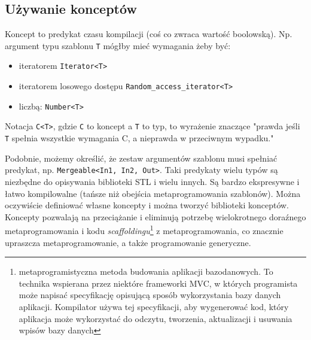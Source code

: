 \documentclass[11pt, a4paper]{article}
\begin{document}
\lstset{language=C++}

\subsection{Używanie konceptów}

Koncept to predykat czasu kompilacji (coś co zwraca wartość boolowską). Np. argument typu szablonu \verb#T# mógłby mieć wymagania żeby być:

\begin{itemize}

\item iteratorem \verb#Iterator<T>#

\item iteratorem losowego dostępu \verb#Random_access_iterator<T>#

\item liczbą: \verb#Number<T>#

\end{itemize}

Notacja \verb#C<T>#, gdzie \verb#C# to koncept a \verb#T# to typ, to wyrażenie znaczące "prawda jeśli \verb#T# spełnia wszystkie wymagania C, a nieprawda w przeciwnym wypadku."

Podobnie, możemy określić, że zestaw argumentów szablonu musi spełniać predykat, np. \verb#Mergeable<In1, In2, Out>#. Taki predykaty wielu typów są niezbędne do opisywania biblioteki STL i wielu innych. Są bardzo ekspresywne i łatwo kompilowalne (tańsze niż obejścia metaprogramowania szablonów). Można oczywiście definiować własne koncepty i można tworzyć biblioteki konceptów. Koncepty pozwalają na przeciążanie i eliminują potrzebę wielokrotnego doraźnego metaprogramowania i kodu \emph{scaffoldingu}\footnote{metaprogramistyczna metoda budowania aplikacji bazodanowych. To technika wspierana przez niektóre frameworki MVC, w których programista może napisać specyfikację opisującą sposób wykorzystania bazy danych aplikacji. Kompilator używa tej specyfikacji, aby wygenerować kod, który aplikacja może wykorzystać do odczytu, tworzenia, aktualizacji i usuwania wpisów bazy danych } z metaprogramowania, co znacznie upraszcza metaprogramowanie, a także programowanie generyczne.
\end{document}
